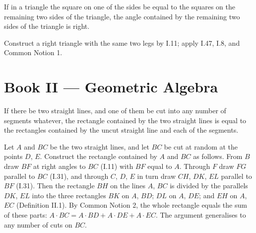 \documentclass{rrxiv}
\begin{document}
\begin{claim}
\label{prop:I.48}
If in a triangle the square on one of the sides be equal to the
squares on the remaining two sides of the triangle, the angle
contained by the remaining two sides of the triangle is right.
\end{claim}
\begin{evidence}[Proof of I.48]
\label{ev:I.48}
Construct a right triangle with the same two legs by I.11; apply
I.47, I.8, and Common Notion 1.
\end{evidence}
%
%

\section{Book II --- Geometric Algebra}
\label{sec:book-II}

\begin{claim}
\label{prop:II.1}
If there be two straight lines, and one of them be cut into any
number of segments whatever, the rectangle contained by the two
straight lines is equal to the rectangles contained by the
uncut straight line and each of the segments.
\end{claim}
\begin{evidence}[Proof of II.1]
\label{ev:II.1}
Let $A$ and $BC$ be the two straight lines, and let $BC$ be cut at
random at the points $D$, $E$.  Construct the rectangle contained by
$A$ and $BC$ as follows.  From $B$ draw $BF$ at right angles to $BC$
(I.11) with $BF$ equal to $A$.  Through $F$ draw $FG$ parallel to $BC$
(I.31), and through $C$, $D$, $E$ in turn draw $CH$, $DK$, $EL$
parallel to $BF$ (I.31).  Then the rectangle $BH$ on the lines $A$,
$BC$ is divided by the parallels $DK$, $EL$ into the three rectangles
$BK$ on $A$, $BD$; $DL$ on $A$, $DE$; and $EH$ on $A$, $EC$
(Definition II.1).  By Common Notion 2, the whole rectangle equals
the sum of these parts: $A \cdot BC = A\cdot BD + A\cdot DE +
A\cdot EC$.  The argument generalises to any number of cuts on $BC$.
\end{evidence}
\end{document}
